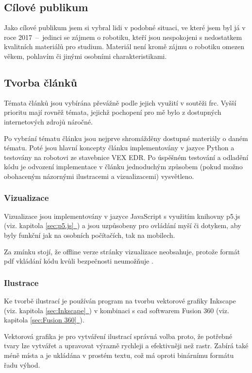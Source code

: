 \documentclass[a4paper, 12pt]{article}
\newcommand*{\fullref}[1]{\hyperref[{#1}]{\ref*{#1}~\nameref*{#1}}}
\begin{document}
  \subsection{Cílové publikum}
  Jako cílové publikum jsem si vybral lidi v podobné situaci, ve které jsem byl já v roce 2017~--~jedinci se zájmem o robotiku, kteří jsou nespokojeni s nedostatkem kvalitních materiálů pro studium. Materiál není kromě zájmu o robotiku omezen věkem, pohlavím či jinými osobními charakteristikami.


  \subsection{Tvorba článků} \label{sec:Tvorba článků}
  Témata článků jsou vybírána převážně podle jejich využití v soutěži \gls{frc}. Vyšší prioritu mají rovněž témata, jejichž pochopení pro mě bylo z dostupných internetových zdrojů náročné.

  Po vybrání tématu článku jsou nejprve shromážděny dostupné materiály o daném tématu. Poté jsou hlavní koncepty článku implementovány v jazyce Python a testovány na robotovi ze stavebnice VEX EDR. Po úspěšném testování a odladění kódu je odvození implementace v článku jednoduchým způsobem (pokud možno obohaceným názornými ilustracemi a vizualizacemi) vysvětleno.


  \subsubsection{Vizualizace} \label{sec:Vizualizace}
  Vizualizace jsou implementovány v jazyce JavaScript s využitím knihovny p5.js (viz. kapitola \fullref{sec:p5.js}) a jsou uzpůsobeny pro ovládání myší či dotykem, aby byly funkční jak na osobních počítačích, tak na mobilech.

  Za zmínku stojí, že offline verze stránky vizualizace neobsahuje, protože formát \gls{pdf} vkládání kódu kvůli bezpečnosti neumožňuje \cite{history-of-pdf}.


  \subsubsection{Ilustrace} \label{sec:Ilustrace}
  Ke tvorbě ilustrací je používán program na tvorbu vektorové grafiky Inkscape (viz. kapitola \fullref{sec:Inkscape}) v kombinaci s \gls{cad} softwarem Fusion 360 (viz. kapitola \fullref{sec:Fusion 360}).

  Vektorová grafika je pro vytváření ilustrací správná volba proto, že potřebné tvary lze vytvářet a upravovat výrazně rychleji a efektivněji než rastr. Zabírá také méně místa a je ukládána v prostém textu, což má oproti binárnímu formátu řadu výhod.
\end{document}
